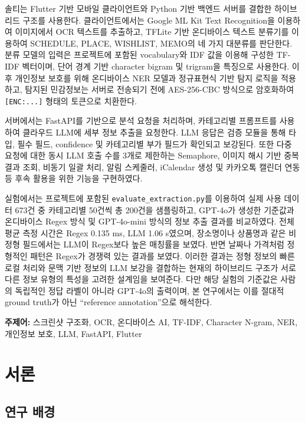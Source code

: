 \documentclass[11pt,a4paper]{article}
\begin{document}
솔티는 Flutter 기반 모바일 클라이언트와 Python 기반 백엔드 서버를 결합한 하이브리드 구조를 사용한다. 클라이언트에서는 Google ML Kit Text Recognition을 이용하여 이미지에서 OCR 텍스트를 추출하고, TFLite 기반 온디바이스 텍스트 분류기를 이용하여 SCHEDULE, PLACE, WISHLIST, MEMO의 네 가지 대분류를 판단한다. 분류 모델의 입력은 프로젝트에 포함된 vocabulary와 IDF 값을 이용해 구성한 TF-IDF 벡터이며, 단어 경계 기반 character bigram 및 trigram을 특징으로 사용한다. 이후 개인정보 보호를 위해 온디바이스 NER 모델과 정규표현식 기반 탐지 로직을 적용하고, 탐지된 민감정보는 서버로 전송되기 전에 AES-256-CBC 방식으로 암호화하여 \texttt{[ENC:...]} 형태의 토큰으로 치환한다.

서버에서는 FastAPI를 기반으로 분석 요청을 처리하며, 카테고리별 프롬프트를 사용하여 클라우드 LLM에 세부 정보 추출을 요청한다. LLM 응답은 검증 모듈을 통해 타입, 필수 필드, confidence 및 카테고리별 부가 필드가 확인되고 보강된다. 또한 다중 요청에 대한 동시 LLM 호출 수를 3개로 제한하는 Semaphore, 이미지 해시 기반 중복 결과 조회, 비동기 일괄 처리, 알림 스케줄러, iCalendar 생성 및 카카오톡 캘린더 연동 등 후속 활용을 위한 기능을 구현하였다.

실험에서는 프로젝트에 포함된 \texttt{evaluate\_extraction.py}를 이용하여 실제 사용 데이터 673건 중 카테고리별 50건씩 총 200건을 샘플링하고, GPT-4o가 생성한 기준값과 온디바이스 Regex 방식 및 GPT-4o-mini 방식의 정보 추출 결과를 비교하였다. 전체 평균 측정 시간은 Regex 0.135 ms, LLM 1.06 s였으며, 장소명이나 상품명과 같은 비정형 필드에서는 LLM이 Regex보다 높은 매칭률을 보였다. 반면 날짜나 가격처럼 정형적인 패턴은 Regex가 경쟁력 있는 결과를 보였다. 이러한 결과는 정형 정보의 빠른 로컬 처리와 문맥 기반 정보의 LLM 보강을 결합하는 현재의 하이브리드 구조가 서로 다른 정보 유형의 특성을 고려한 설계임을 보여준다. 다만 해당 실험의 기준값은 사람의 독립적인 정답 라벨이 아니라 GPT-4o의 출력이며, 본 연구에서는 이를 절대적 ground truth가 아닌 ``reference annotation''으로 해석한다.

\textbf{주제어:} 스크린샷 구조화, OCR, 온디바이스 AI, TF-IDF, Character N-gram, NER, 개인정보 보호, LLM, FastAPI, Flutter

\newpage

\section{서론}

\subsection{연구 배경}
\end{document}
